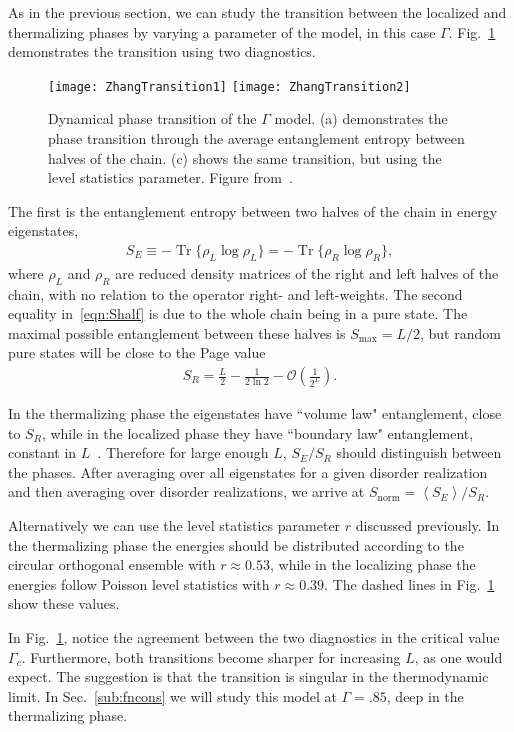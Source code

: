 \documentclass[a4paper,12pt]{article}
\renewcommand{\th}[1]{\frac{1}{#1}}
\newcommand{\ex}[1]{\left\langle #1 \right\rangle}
\DeclareMathOperator{\Tr}{Tr}
\begin{document}
As in the previous section, we can study the transition between the localized and thermalizing phases by varying a parameter of the model, in this case $\Gamma$. Fig.~\ref{fig:floqtrans} demonstrates the transition using two diagnostics. 
\begin{figure}
	\centering
	\texttt{[image: ZhangTransition1]}
	\texttt{[image: ZhangTransition2]}
	\caption{Dynamical phase transition of the $\Gamma$ model. (a) demonstrates the phase transition through the average entanglement entropy between halves of the chain. (c) shows the same transition, but using the level statistics parameter. Figure from~\cite{ZhangFloq}.}
	\label{fig:floqtrans}
\end{figure}
The first is the entanglement entropy between two halves of the chain in energy eigenstates, 
\begin{align}
S_E \equiv -\Tr\{\rho_L\log\rho_L\} = -\Tr\{\rho_R\log\rho_R\},\label{eqn:Shalf}
\end{align}
where $\rho_L$ and $\rho_R$ are reduced density matrices of the right and left halves of the chain, with no relation to the operator right- and left-weights. The second equality in~\ref{eqn:Shalf} is due to the whole chain being in a pure state. The maximal possible entanglement between these halves is $S_\text{max}=L/2$, but random pure states will be close to the Page value~\cite{Page, ZhangTherm}
\begin{align}
S_R = \frac{L}{2} - \th{2\ln 2} -\mathcal{O}\left(\th{2^L}\right).
\end{align}

In the thermalizing phase the eigenstates have ``volume law" entanglement, close to $S_R$, while in the localized phase they have ``boundary law" entanglement, constant in $L$~\cite{ZhangFloq}. Therefore for large enough $L$, $S_E/S_R$ should distinguish between the phases. After averaging over all eigenstates for a given disorder realization and then averaging over disorder realizations, we arrive at $S_\text{norm} = \ex{S_E}/S_R$.

Alternatively we can use the level statistics parameter $r$ discussed previously. In the thermalizing phase the energies should be distributed according to the circular orthogonal ensemble with $r \approx 0.53$, while in the localizing phase the energies follow Poisson level statistics with $r\approx 0.39$. The dashed lines in Fig.~\ref{fig:floqtrans} show these values.

In Fig.~\ref{fig:floqtrans}, notice the agreement between the two diagnostics in the critical value $\Gamma_c$. Furthermore, both transitions become sharper for increasing $L$, as one would expect. The suggestion is that the transition is singular in the thermodynamic limit. In Sec.~\ref{sub:fncons} we will study this model at $\Gamma=.85$, deep in the thermalizing phase.
\end{document}
